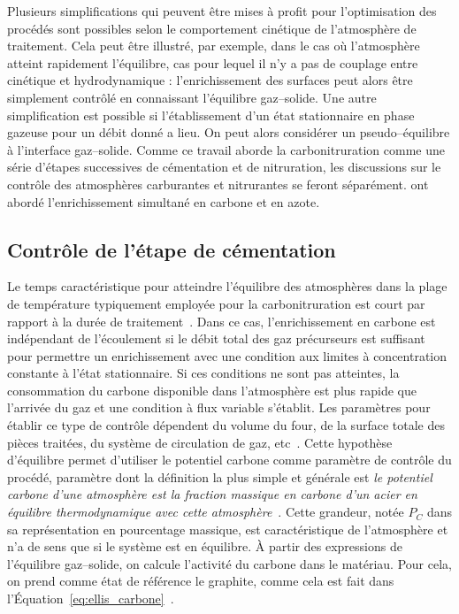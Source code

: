 Plusieurs simplifications qui peuvent être mises à profit pour l'optimisation des procédés sont possibles selon le comportement cinétique de l'atmosphère de traitement. Cela peut être illustré, par exemple, dans le cas où l'atmosphère atteint rapidement l'équilibre, cas pour lequel il n'y a pas de couplage entre cinétique et hydrodynamique : l'enrichissement des surfaces peut alors être simplement contrôlé en connaissant l'équilibre gaz--solide. Une autre simplification est possible si l'établissement d'un état stationnaire en phase gazeuse pour un débit donné a lieu. On peut alors considérer un pseudo--équilibre à l'interface gaz--solide. Comme ce travail aborde la carbonitruration comme une série d'étapes successives de cémentation et de nitruration, les discussions sur le contrôle des atmosphères carburantes et nitrurantes se feront séparément. \citet{Slycke1981i} ont abordé l'enrichissement simultané en carbone et en azote.

\subsection{Contrôle de l'étape de cémentation}
\label{sec:controle_cementation}

Le temps caractéristique pour atteindre l'équilibre des atmosphères  dans la plage de température typiquement employée pour la carbonitruration  est court par rapport à la durée de traitement~\cite{Yahia1995,Dulcy2007}. Dans ce cas, l'enrichissement en carbone est indépendant de l'écoulement si le débit total des gaz précurseurs est suffisant pour permettre un enrichissement avec une condition aux limites à concentration constante à l'état stationnaire.  Si ces conditions ne sont pas atteintes, la consommation du carbone disponible dans l'atmosphère est plus rapide que l'arrivée du gaz et une condition à flux variable s'établit. Les paramètres pour établir ce type de contrôle dépendent du volume du four, de la surface totale des pièces traitées, du système de circulation de gaz, etc~\cite{Dulcy2007}. Cette hypothèse d'équilibre permet d'utiliser le potentiel carbone comme paramètre de contrôle du procédé, paramètre dont la définition la plus simple et générale est \og{}\textit{le potentiel carbone d'une atmosphère est la fraction massique en carbone d'un acier en équilibre thermodynamique avec cette atmosphère}~\cite{Dulcy2007}{}\fg.  Cette grandeur, notée $P_{C}$ dans sa représentation en pourcentage massique, est caractéristique de l'atmosphère et n'a de sens que si le système est en équilibre.  À partir des expressions de l'équilibre gaz--solide, on calcule l'activité du carbone dans le matériau. Pour cela, on prend comme état de référence le graphite, comme cela est fait dans l'Équation~\ref{eq:ellis_carbone}~\cite{Dulcy2007}.

